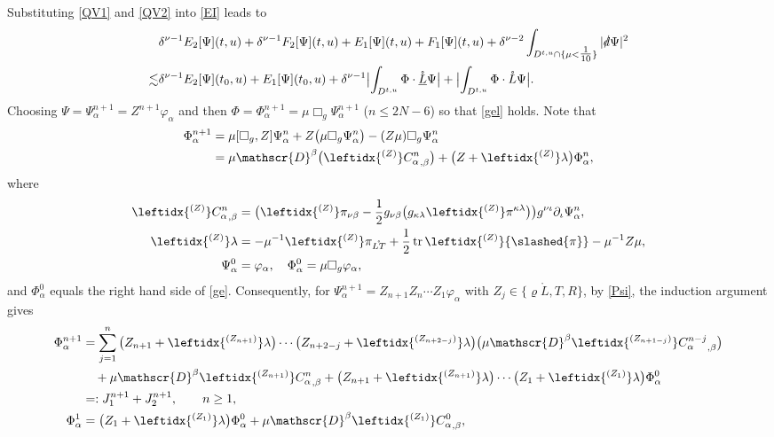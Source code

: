 \documentclass[11pt,twoside]{article}
\def\al{\alpha}
\begin{document}
Substituting \eqref{QV1} and \eqref{QV2} into \eqref{EI} leads to
\begin{equation}\label{e}
\begin{split}
&\delta^{\nu-1} E_2[\Psi](t, u) + \delta^{\nu-1} F_2[\Psi](t, u) + E_1[\Psi](t, u) + F_1[\Psi](t, u)+ \delta^{\nu-2} \int_{D^{t, u} \cap \{\mu < \tfrac{1}{10}\}} |\slashed{d}\Psi|^2 \\
\lesssim &\delta^{\nu-1} E_2[\Psi](t_0, u) + E_1[\Psi](t_0, u) + \delta^{\nu-1} \bigl| \int_{D^{t, u}} \Phi \cdot \mathring{\underline{L}}\Psi \bigr| + \bigl| \int_{D^{t, u}} \Phi \cdot \mathring{L}\Psi \bigr|.
\end{split}
\end{equation}
Choosing $\Psi = \Psi_\al^{n+1} = Z^{n+1}\varphi_\al$ and then
$\Phi = \Phi_\al^{n+1} = \mu\Box_g\Psi_\al^{n+1}$ ($n \leq 2N-6$)
so that \eqref{gel} holds. Note that
\begin{equation}\label{Psi}
\begin{split}
\Phi_\al^{n+1} &= \mu[\Box_g,Z]\Psi_\al^{n} + Z\big(\mu\Box_g\Psi_\al^{n}\big)-(Z\mu)\Box_g\Psi_\al^{n}\\
&= \mu\mathscr{D}^\beta\big({\leftidx{^{(Z)}}C_{\al}^{n}}_{,\beta}\big)
+ \big(Z + \leftidx{^{(Z)}}\lambda\big)\Phi_\al^{n},
\end{split}
\end{equation}
where
\begin{equation}\label{ClP}
\begin{split}
{\leftidx{^{(Z)}}C_{\al}^{n}}_{,\beta} &= \big(\leftidx{^{(Z)}}\pi_{\nu\beta}
- \frac{1}{2}g_{\nu\beta}\big(g_{\kappa\lambda}\leftidx{^{(Z)}}\pi^{\kappa\lambda}\big)\big)g^{\nu\iota}\partial_\iota\Psi_\al^{n}, \\
\leftidx{^{(Z)}}\lambda &= -\mu^{-1}\leftidx{^{(Z)}}\pi_{\mathring{LT}}
+ \frac{1}{2}\operatorname{tr}\leftidx{^{(Z)}}{\slashed{\pi}} - \mu^{-1}Z\mu,\\
\Psi_\al^0 &= \varphi_\al, \quad
\Phi_\al^0 = \mu\Box_g\varphi_\al,
\end{split}
\end{equation}
and $\Phi_\al^0$ equals the right hand side of \eqref{ge}.
Consequently, for $\Psi_\al^{n+1} = Z_{n+1}Z_{n}\cdots Z_{1}\varphi_\al$ with $Z_j \in \{\varrho\mathring{L}, T, R\}$,
by \eqref{Psi}, the induction argument gives
\begin{equation}\label{Phik}
\begin{split}
\Phi_\al^{n+1} &= \sum_{j=1}^{n} \big(Z_{n+1} + \leftidx{^{(Z_{n+1})}}\lambda\big) \cdots
\big(Z_{n+2-j} + \leftidx{^{(Z_{n+2-j})}}\lambda\big)
\big(\mu\mathscr{D}^\beta{\leftidx{^{(Z_{n+1-j})}}C_{\al}^{n-j}}_{,\beta}\big) \\
&\quad + \mu\mathscr{D}^\beta{\leftidx{^{(Z_{n+1})}}C_\al^{n}}_{,\beta}
+ \big(Z_{n+1} + \leftidx{^{(Z_{n+1})}}\lambda\big) \cdots
\big(Z_{1} + \leftidx{^{(Z_1)}}\lambda\big)\Phi_\al^0 \\
&=: J_1^{n+1} + J_2^{n+1}, \qquad n \geq 1, \\
\Phi_\al^{1} &= \big(Z_{1} + \leftidx{^{(Z_1)}}\lambda\big)\Phi_\al^0
+ \mu\mathscr{D}^\beta{\leftidx{^{(Z_{1})}}C_{\al}^{0}}_{,\beta},
\end{split}
\end{equation}
\end{document}
